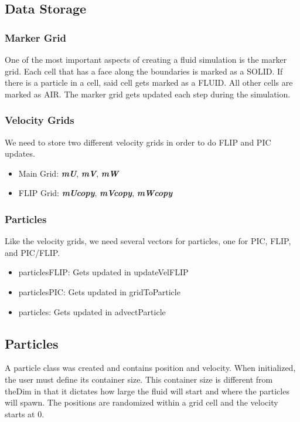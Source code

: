 \documentclass[a4paper]{article}
\begin{document}
    \subsection{Data Storage}
    \subsubsection{Marker Grid}
    One of the most important aspects of creating a fluid simulation is the marker grid. Each cell that has a face along the boundaries is marked as a SOLID. If there is a particle in a cell, said cell gets marked as a FLUID. All other cells are marked as AIR. The marker grid gets updated each step during the simulation.
    
    \subsubsection{Velocity Grids}
    We need to store two different velocity grids in order to do FLIP and PIC updates. \newline
    \begin{itemize}
      \item Main Grid: \textbf{\textit{mU}}, \textbf{\textit{mV}}, \textbf{\textit{mW}}
      \item FLIP Grid: \textbf{\textit{mUcopy}}, \textbf{\textit{mVcopy}}, \textbf{\textit{mWcopy}}
    \end{itemize}
    
    \subsubsection{Particles}
    Like the velocity grids, we need several vectors for particles, one for PIC, FLIP, and PIC/FLIP.
    \begin{itemize}
        \item particlesFLIP: Gets updated in updateVelFLIP
        \item particlesPIC: Gets updated in gridToParticle 
        \item particles: Gets updated in advectParticle
    \end{itemize}
    
    \subsection{Particles}
    A particle class was created and contains position and velocity. When initialized, the user must define its container size. This container size is different from theDim in that it dictates how large the fluid will start and where the particles will spawn. The positions are randomized within a grid cell and the velocity starts at 0. 
    
\end{document}
